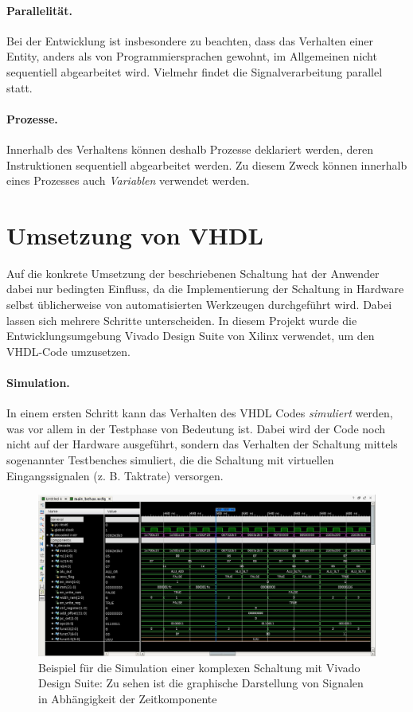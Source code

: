 \paragraph{Parallelität.} Bei der Entwicklung ist insbesondere zu beachten, dass das Verhalten einer Entity, anders als von Programmiersprachen gewohnt, im Allgemeinen nicht sequentiell abgearbeitet wird. Vielmehr findet die Signalverarbeitung parallel statt.

\paragraph{Prozesse.} Innerhalb des Verhaltens können deshalb Prozesse deklariert werden, deren Instruktionen sequentiell abgearbeitet werden. Zu diesem Zweck können innerhalb eines Prozesses auch \textit{Variablen} verwendet werden. \cite[S. 29f.]{kesel2013entwurf}
 
\section{Umsetzung von VHDL}
Auf die konkrete Umsetzung der beschriebenen Schaltung hat der Anwender dabei nur bedingten Einfluss, da die Implementierung der Schaltung in Hardware selbst üblicherweise von automatisierten Werkzeugen durchgeführt wird. Dabei lassen sich mehrere Schritte unterscheiden. In diesem Projekt wurde die Entwicklungsumgebung Vivado Design Suite von Xilinx verwendet, um den VHDL-Code umzusetzen.

\paragraph{Simulation.} In einem ersten Schritt kann das Verhalten des VHDL Codes \emph{simuliert} werden, was vor allem in der Testphase von Bedeutung ist. Dabei wird der Code noch nicht auf der Hardware ausgeführt, sondern das Verhalten der Schaltung mittels sogenannter Testbenches simuliert, die die Schaltung mit virtuellen Eingangssignalen (z. B. Taktrate) versorgen. \cite[S. 81]{SynthesisFPGA}

\begin{figure} [ht]
  \centering
  \includegraphics[width=\textwidth]{Figures/simulation}
  \caption{Beispiel für die Simulation einer komplexen Schaltung mit Vivado Design Suite: Zu sehen ist die graphische Darstellung von Signalen in Abhängigkeit der Zeitkomponente}
  \label{fig:simulation}
\end{figure}


